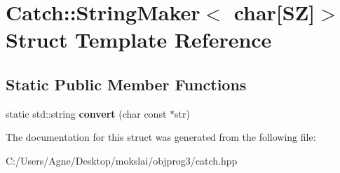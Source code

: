\hypertarget{struct_catch_1_1_string_maker_3_01char[_s_z]_4}{}\section{Catch\+:\+:String\+Maker$<$ char\mbox{[}SZ\mbox{]}$>$ Struct Template Reference}
\label{struct_catch_1_1_string_maker_3_01char[_s_z]_4}
\subsection*{Static Public Member Functions}
\begin{DoxyCompactItemize}
\item 
\mbox{\label{struct_catch_1_1_string_maker_3_01char[_s_z]_4_a095e415534f9145300271befe9853357}} 
static std\+::string {\bfseries convert} (char const $\ast$str)
\end{DoxyCompactItemize}


The documentation for this struct was generated from the following file\+:\begin{DoxyCompactItemize}
\item 
C\+:/\+Users/\+Agne/\+Desktop/mokslai/objprog3/catch.\+hpp\end{DoxyCompactItemize}
